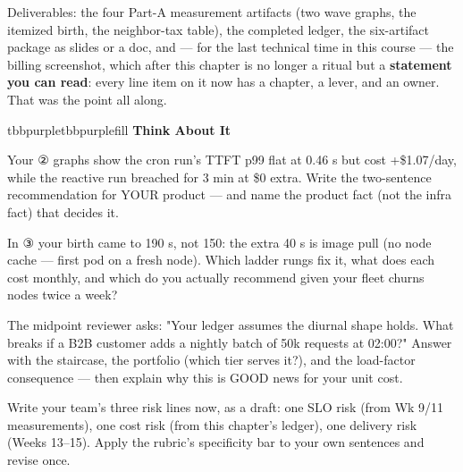 \vspace{3.0pt}

Deliverables: the four Part-A measurement artifacts (two wave graphs, the itemized birth, the neighbor-tax table), the completed ledger, the six-artifact package as slides or a doc, and — for the last technical time in this course — the billing screenshot, which after this chapter is no longer a ritual but a \textbf{statement you can read}: every line item on it now has a chapter, a lever, and an owner. That was the point all along.

\begin{calloutbox}{tbbpurple}{tbbpurplefill}
{\normalsize\bfseries\color{tbbpurple}Think About It}\par\vspace{3pt}
\begin{tbbitemize}
  \item Your ② graphs show the cron run's TTFT p99 flat at 0.46 s but cost +\$1.07/day, while the reactive run breached for 3 min at \$0 extra. Write the two-sentence recommendation for YOUR product — and name the product fact (not the infra fact) that decides it.
  \item In ③ your birth came to 190 s, not 150: the extra 40 s is image pull (no node cache — first pod on a fresh node). Which ladder rungs fix it, what does each cost monthly, and which do you actually recommend given your fleet churns nodes twice a week?
  \item The midpoint reviewer asks: "Your ledger assumes the diurnal shape holds. What breaks if a B2B customer adds a nightly batch of 50k requests at 02:00?" Answer with the staircase, the portfolio (which tier serves it?), and the load-factor consequence — then explain why this is GOOD news for your unit cost.
  \item Write your team's three risk lines now, as a draft: one SLO risk (from Wk 9/11 measurements), one cost risk (from this chapter's ledger), one delivery risk (Weeks 13–15). Apply the rubric's specificity bar to your own sentences and revise once.
\end{tbbitemize}
\end{calloutbox}



